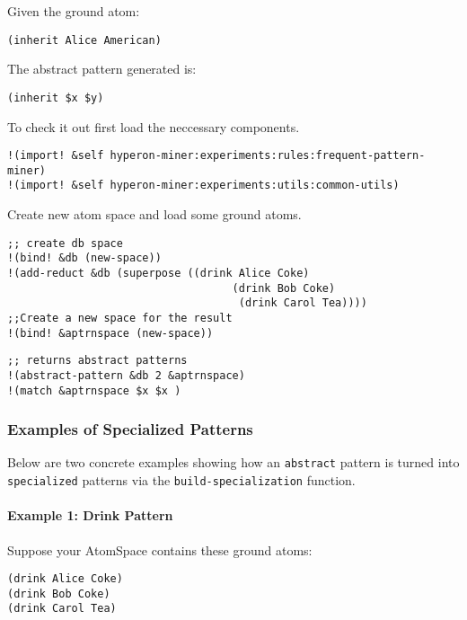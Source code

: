 \documentclass{article}
\begin{document}
Given the ground atom:

\begin{verbatim}
(inherit Alice American)
\end{verbatim}

The abstract pattern generated is:

\begin{verbatim}
(inherit $x $y)
\end{verbatim}

To check it out first load the neccessary components.


\begin{verbatim}
!(import! &self hyperon-miner:experiments:rules:frequent-pattern-miner)
!(import! &self hyperon-miner:experiments:utils:common-utils)
\end{verbatim}

Create new atom space and load some ground atoms.


\begin{verbatim}
;; create db space 
!(bind! &db (new-space))
!(add-reduct &db (superpose ((drink Alice Coke)
                                   (drink Bob Coke)
                                    (drink Carol Tea))))
;;Create a new space for the result                                   
!(bind! &aptrnspace (new-space))
\end{verbatim}

    \begin{verbatim}
;; returns abstract patterns
!(abstract-pattern &db 2 &aptrnspace)
!(match &aptrnspace $x $x )
    \end{verbatim}

\subsubsection{Examples of Specialized Patterns}

Below are two concrete examples showing how an \texttt{abstract} pattern is turned into \texttt{specialized} patterns via the \texttt{build-specialization} function.

\paragraph{Example 1: Drink Pattern}

Suppose your AtomSpace contains these ground atoms:

\begin{verbatim}
(drink Alice Coke)
(drink Bob Coke)
(drink Carol Tea)
\end{verbatim}
\end{document}
